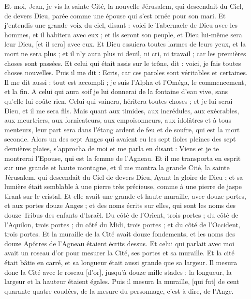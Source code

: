 \begin{multicols}{2}
Et moi, Jean, je vis la sainte Cité, la nouvelle Jérusalem, qui descendait du Ciel, de devers Dieu, parée comme une épouse qui s'est ornée pour son mari.
Et j'entendis une grande voix du ciel, disant : voici le Tabernacle de Dieu avec les hommes, et il habitera avec eux ; et ils seront son peuple, et Dieu lui-même sera leur Dieu, [et il sera] avec eux.
Et Dieu essuiera toutes larmes de leurs yeux, et la mort ne sera plus ; et il n'y aura plus ni deuil, ni cri, ni travail ; car les premières choses sont passées.
Et celui qui était assis sur le trône, dit : voici, je fais toutes choses nouvelles. Puis il me dit : Ecris, car ces paroles sont véritables et certaines.
Il me dit aussi : tout est accompli ; je suis l'Alpha et l'Oméga, le commencement, et la fin. A celui qui aura soif je lui donnerai de la fontaine d'eau vive, sans qu'elle lui coûte rien.
Celui qui vaincra, héritera toutes choses ; et je lui serai Dieu, et il me sera fils.
Mais quant aux timides, aux incrédules, aux exécrables, aux meurtriers, aux fornicateurs, aux empoisonneurs, aux idolâtres et à tous menteurs, leur part sera dans l'étang ardent de feu et de soufre, qui est la mort seconde.
Alors un des sept Anges qui avaient eu les sept fioles pleines des sept dernières plaies, s'approcha de moi et me parla en disant : Viens et je te montrerai l'Epouse, qui est la femme de l'Agneau.
Et il me transporta en esprit sur une grande et haute montagne, et il me montra la grande Cité, la sainte Jérusalem, qui descendait du Ciel de devers Dieu,
Ayant la gloire de Dieu ; et sa lumière était semblable à une pierre très précieuse, comme à une pierre de jaspe tirant sur le cristal.
Et elle avait une grande et haute muraille, avec douze portes, et aux portes douze Anges ; et des noms écrits sur elles, qui sont les noms des douze Tribus des enfants d'Israël.
Du côté de l'Orient, trois portes ; du côté de l'Aquilon, trois portes ; du côté du Midi, trois portes ; et du côté de l'Occident, trois portes.
Et la muraille de la Cité avait douze fondements, et les noms des douze Apôtres de l'Agneau étaient écrits dessus.
Et celui qui parlait avec moi avait un roseau d'or pour mesurer la Cité, ses portes et sa muraille.
Et la cité était bâtie en carré, et sa longueur était aussi grande que sa largeur. Il mesura donc la Cité avec le roseau [d'or], jusqu'à douze mille stades ; la longueur, la largeur et la hauteur étaient égales.
Puis il mesura la muraille, [qui fut] de cent quarante-quatre coudées, de la mesure du personnage, c'est-à-dire, de l'Ange.

\end{multicols}
